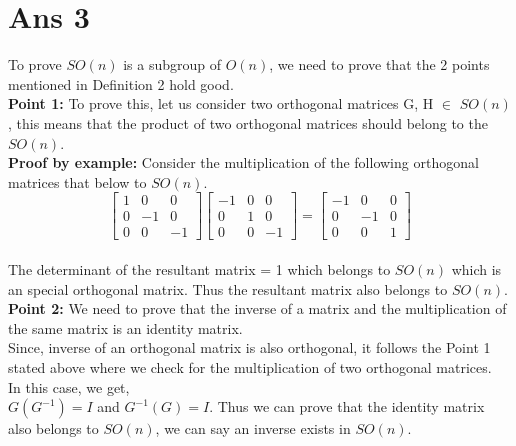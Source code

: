 \documentclass[10pt]{article}
\begin{document}
\section*{Ans 3}
\begin{flushleft}
To prove $SO(n)$ is a subgroup of $O(n)$, we need to prove that the 2 points mentioned in Definition 2 hold good.\\
\vspace{0.5em}
\textbf{Point 1:} To prove this, let us consider two orthogonal matrices G, H $\in$ $SO(n)$, this means that the product of two orthogonal matrices should belong to the $SO(n)$.\\
\vspace{0.5em}
\textbf{Proof by example:} Consider the multiplication of the following orthogonal matrices that below to $SO(n)$. \\
$$
\begin{bmatrix} 
1 & 0 & 0 \\
0 & -1 & 0 \\
0 & 0 & -1 
\end{bmatrix} 
\begin{bmatrix} 
-1 & 0 & 0 \\
0 & 1 & 0 \\
0 & 0 & -1 
\end{bmatrix} 
= 
\begin{bmatrix} 
-1 & 0 & 0 \\
0 & -1 & 0 \\
0 & 0 & 1 
\end{bmatrix} 
$$
\\
The determinant of the resultant matrix  = 1 which belongs to $SO(n)$ which is an special orthogonal matrix. Thus the resultant matrix also belongs to $SO(n)$.\\
\vspace{0.5em}
\textbf{Point 2: } We need to prove that the inverse of a matrix and the multiplication of the same matrix is an identity matrix. \\
\vspace{0.5em}
Since, inverse of an orthogonal matrix is also orthogonal, it follows the Point 1 stated above where we check for the multiplication of two orthogonal matrices. \\
In this case, we get,\\
$G (G^{-1}) = I$ and $G^{-1} (G) = I$. Thus we can prove that the identity matrix also belongs to $SO(n)$, we can say an inverse exists in $SO(n)$.
\end{flushleft}
\end{document}

